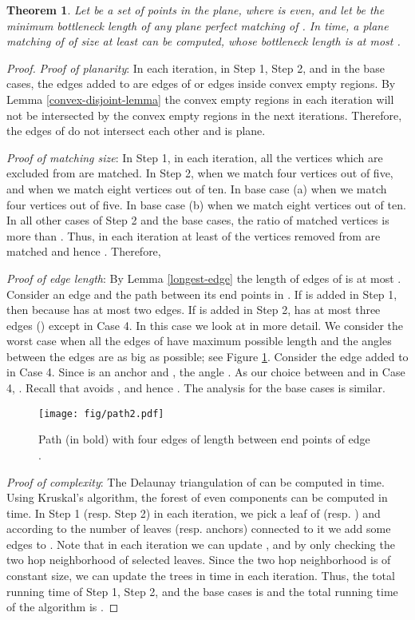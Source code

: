 \documentclass[11pt,a4paper]{article}
\newtheorem{theorem}{Theorem}
\begin{document}
\begin{theorem}
Let  be a set of  points in the plane, where  is even, and let  be the minimum bottleneck length of any plane perfect matching of . In  time, a plane matching of  of size at least  can be computed, whose bottleneck length is at most .
\end{theorem}
\begin{proof}

 {\em Proof of planarity}: In each iteration, in Step 1, Step 2, and in the base cases, the edges added to  are edges of  or edges inside convex empty regions. By Lemma \ref{convex-disjoint-lemma} the convex empty regions in each iteration will not be intersected by the convex empty regions in the next iterations. Therefore, the edges of  do not intersect each other and  is plane.

{\em Proof of matching size}: In Step 1, in each iteration, all the vertices which are excluded from  are matched. In Step 2, when  we match four vertices out of five, and when  we match eight vertices out of ten. In base case (a) when  we match four vertices out of five. In base case (b) when  we match eight vertices out of ten. In all other cases of Step 2 and the base cases, the ratio of matched vertices is more than . Thus, in each iteration at least  of the vertices removed from  are matched and hence . Therefore, 


{\em Proof of edge length}: By Lemma \ref{longest-edge} the length of edges of  is at most . Consider an edge  and the path  between its end points in . If  is added in Step 1, then  because  has at most two edges. If  is added in Step 2,  has at most three edges () except in Case 4. In this case we look at  in more detail. We consider the worst case when all the edges of  have maximum possible length  and the angles between the edges are as big as possible; see Figure \ref{path-fig}. Consider the edge  added to  in Case 4. Since  is an anchor and , the angle . As our choice between  and  in Case 4, . Recall that  avoids , and hence . The analysis for the base cases is similar.

\begin{figure}[ht]
  \centering
    \texttt{[image: fig/path2.pdf]}
  \caption{Path  (in bold) with four edges of length  between end points of edge .}
\label{path-fig}
\end{figure}

{\em Proof of complexity}: The Delaunay triangulation of  can be computed in  time. Using Kruskal's algorithm, the forest  of even components can be computed in  time. 
In Step 1 (resp. Step 2) in each iteration, we pick a leaf of  (resp. ) and according to the number of leaves (resp. anchors) connected to it we add some edges to . Note that in each iteration we can update ,  and  by only checking the two hop neighborhood of selected leaves. Since the two hop neighborhood is of constant size, we can update the trees in  time in each iteration. 
Thus, the total running time of Step 1, Step 2, and the base cases is  and the total running time of the algorithm is .
\end{proof}
\end{document}
